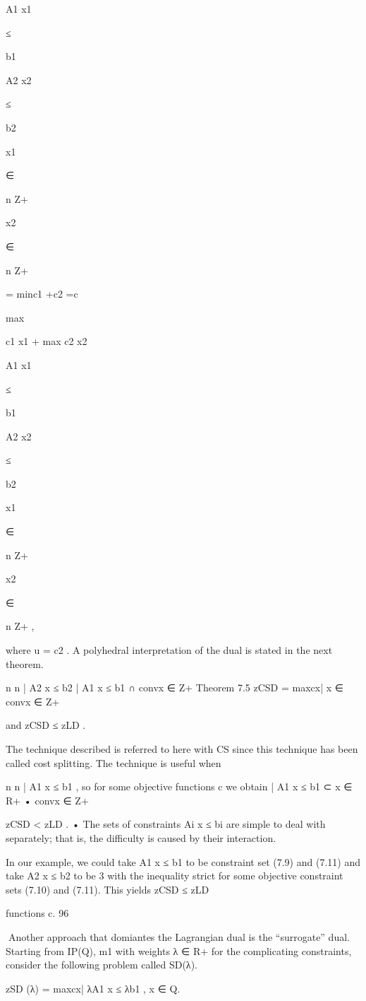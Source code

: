 A1 x1

≤

b1

A2 x2

≤

b2

x1

∈

n
Z+

x2

∈

n
Z+

= minc1 +c2 =c {

max

c1 x1 + max c2 x2 }

A1 x1

≤

b1

A2 x2

≤

b2

x1

∈

n
Z+

x2

∈

n
Z+
,

where u = c2 .
A polyhedral interpretation of the dual is stated in the next theorem.

n
n
| A2 x ≤ b2 
| A1 x ≤ b1  ∩ convx ∈ Z+
Theorem 7.5 zCSD = maxcx| x ∈ convx ∈ Z+

and zCSD ≤ zLD .

The technique described is referred to here with CS since this technique has been called cost splitting.
The technique is useful when

n
n
| A1 x ≤ b1 , so for some objective functions c we obtain
| A1 x ≤ b1  ⊂ x ∈ R+
• convx ∈ Z+

zCSD < zLD .
• The sets of constraints Ai x ≤ bi are simple to deal with separately; that is, the difficulty is caused
by their interaction.

In our example, we could take A1 x ≤ b1 to be constraint set (7.9) and (7.11) and take A2 x ≤ b2 to be
3
with the inequality strict for some objective
constraint sets (7.10) and (7.11). This yields zCSD ≤ zLD

functions c.
96

Another approach that domiantes the Lagrangian dual is the “surrogate” dual. Starting from IP(Q),
m1
with weights λ ∈ R+
for the complicating constraints, consider the following problem called SD(λ).

zSD (λ) = max{cx| λA1 x ≤ λb1 , x ∈ Q}.

